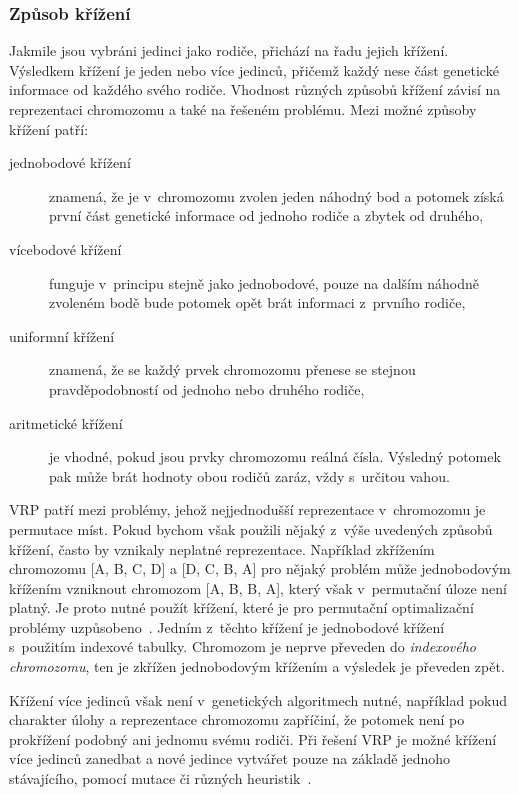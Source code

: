 \documentclass[a4paper]{article}
\begin{document}
\subsubsection{Způsob křížení}
Jakmile jsou vybráni jedinci jako rodiče, přichází na řadu jejich křížení. Vý\-sled\-kem křížení je jeden nebo více jedinců, přičemž každý nese část genetické informace od každého svého rodiče. Vhodnost různých způsobů křížení závisí na reprezentaci chromozomu a také na řešeném problému. Mezi možné způsoby křížení patří:

\begin{description}
\item[jednobodové křížení] znamená, že je v~chromozomu zvolen jeden náhodný bod a potomek získá první část genetické informace od jednoho rodiče a zbytek od druhého,
\item[vícebodové křížení] funguje v~principu stejně jako jednobodové, pouze na dalším náhodně zvoleném bodě bude potomek opět brát informaci z~prv\-ní\-ho rodiče,
\item[uniformní křížení] znamená, že se každý prvek chromozomu přenese se stejnou pravděpodobností od jednoho nebo druhého rodiče,
\item[aritmetické křížení] je vhodné, pokud jsou prvky chromozomu reálná čísla. Výsledný potomek pak může brát hodnoty obou rodičů zaráz, vždy s~ur\-či\-tou vahou.
\end{description}

VRP patří mezi problémy, jehož nejjednodušší reprezentace v~chromozomu je permutace míst. Pokud bychom však použili nějaký z~výše uvedených způsobů křížení, často by vznikaly neplatné reprezentace. Například zkřížením chromozomu [A, B, C, D] a [D, C, B, A] pro nějaký problém může jednobodovým křížením vzniknout chromozom [A, B, B, A], který však v~permutační úloze není platný. Je proto nutné použít křížení, které je pro permutační optimalizační problémy uzpůsobeno~\cite{sfc}. Jedním z~těchto křížení je jednobodové křížení s~použitím indexové tabulky. Chromozom je neprve převeden do \emph{indexového chromozomu}, ten je zkřížen jednobodovým křížením a výsledek je převeden zpět.

Křížení více jedinců však není v~genetických algoritmech nutné, například pokud charakter úlohy a reprezentace chromozomu zapříčiní, že potomek není po prokřížení podobný ani jednomu svému rodiči. Při řešení VRP je možné křížení více jedinců zanedbat a nové jedince vytvářet pouze na základě jednoho stávajícího, pomocí mutace či různých heuristik~\cite{masum}.
\end{document}
